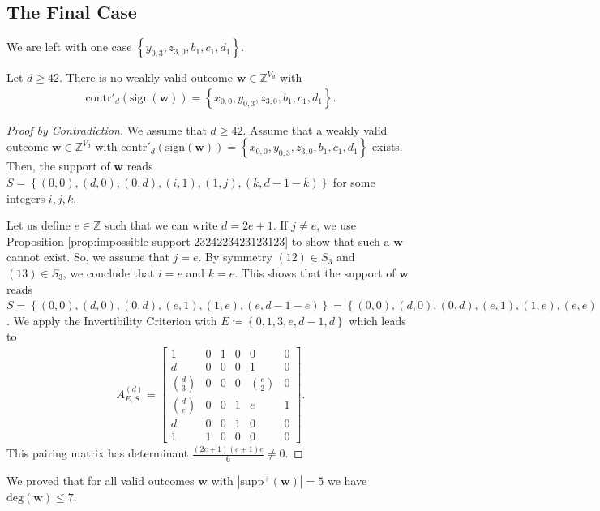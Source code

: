 \subsection*{The Final Case}

We are left with one case  \(  \left\{ y_{0,3}, z_{3,0}, b_1, c_1, d_1 \right\}\).

\begin{proposition}
    Let \( d \geq 42 \).
    There is no weakly valid outcome \( \mathbf{w} \in \mathbb{Z}^{V_d} \) with
    \begin{align*}
        \mathrm{contr}'_d(\mathrm{sign}(\mathbf{w})) =  \left\{ x_{0,0}, y_{0,3}, z_{3,0}, b_1, c_1, d_1 \right\}.
    \end{align*}
\end{proposition}

\begin{proof}[Proof by Contradiction]
    We assume that \( d \geq 42 \). Assume that a weakly valid outcome \( \mathbf{w} \in \mathbb{Z}^{V_d} \) with \( \mathrm{contr}'_d(\mathrm{sign}(\mathbf{w})) =  \left\{ x_{0,0}, y_{0,3}, z_{3,0}, b_1, c_1, d_1 \right\} \) exists. Then, the support of \( \mathbf{w} \) reads \( S = \left\{ (0,0), (d,0), (0,d), (i,1), (1,j), (k, d-1-k) \right\} \)
    for some integers \( i,j, k \). 
    
    Let us define \( e \in \mathbb{Z} \) such that we can write \( d = 2e + 1 \). If \( j \neq e \), we use Proposition \ref{prop:impossible-support-2324223423123123} to show that such a \( \mathbf{w} \) cannot exist. So, we assume that \( j = e \). By symmetry \( (12) \in S_3 \) and \( (13) \in S_3 \), we conclude that \( i = e \) and \( k = e \). This shows that the support of \( \mathbf{w} \) reads \( S = \left\{ (0,0), (d,0), (0,d), (e,1), (1,e), (e, d-1-e) \right\} = \left\{ (0,0), (d,0), (0,d), (e,1), (1,e), (e,e) \right\} \).
    We apply the Invertibility Criterion with \( E \coloneqq \left\{ 0,1,3,e,d-1,d \right\}\) which leads to 
    \begin{align*}
        A^{(d)}_{E,S} = \begin{bmatrix}
            1 & 0 & 1 & 0 & 0 & 0 \\
            d & 0 & 0 & 0 & 1 & 0 \\
            \binom{d}{3} & 0 & 0 & 0 & \binom{e}{2} & 0 \\
            \binom{d}{e} & 0 & 0 & 1 & e & 1 \\
            d & 0 & 0 & 1 & 0 & 0 \\
            1 & 1 & 0 & 0 & 0 & 0
        \end{bmatrix}.
    \end{align*}
    This pairing matrix has determinant \( \frac{(2e + 1)(e + 1)e}{6} \neq 0 \).
\end{proof}

We proved that for all valid outcomes \( \mathbf w \) with \( |\mathrm{supp}^+(\mathbf w)| = 5 \) we have \( \mathrm{deg}(\mathbf w) \leq 7 \).
